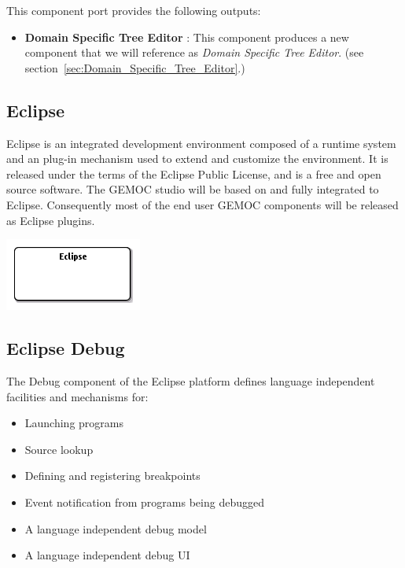 \documentclass{gemoc} %
\begin{document}
This component port provides the following outputs:
\begin{itemize}
  \item \textbf{Domain Specific Tree Editor} :
This component produces a new component that we will reference as \emph{Domain Specific Tree Editor}.
(see section~\ref{sec:Domain_Specific_Tree_Editor}.)
\end{itemize}


\subsection{Eclipse}
\label{sec:Eclipse}
Eclipse is an integrated development environment composed of a runtime system and an plug-in mechanism used to extend and customize the environment. It is released under the terms of the Eclipse Public License, and is a free and open source software. The GEMOC studio will be based on and fully integrated to Eclipse. Consequently most of the end user GEMOC components will be released as Eclipse plugins.

\begin{center}
\includegraphics*[trim=0.0cm 0.0cm 0cm 0.0cm, clip=true]{../images/generated/Generated_Eclipse.png}
\end{center}




\subsection{Eclipse Debug}
\label{sec:Eclipse_Debug}

The Debug component of the Eclipse platform defines language independent facilities and mechanisms for:
\begin{itemize}
\item Launching programs
\item Source lookup
\item Defining and registering breakpoints
\item Event notification from programs being debugged
\item A language independent debug model
\item A language independent debug UI
\end{itemize}
\end{document}
